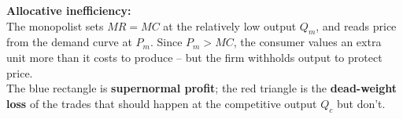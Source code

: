 \documentclass[11pt, a4paper, twoside]{book}
\begin{document}
\begin{diagrambox}
{%
}{%
\textbf{\color{CurveNavy}Allocative inefficiency:}\\[4pt]
The monopolist sets $MR=MC$ at the relatively low output $Q_m$, and reads price from the demand curve at $P_m$.  Since $P_m>MC$, the consumer values an extra unit more than it costs to produce -- but the firm withholds output to protect price.\\[5pt]
The blue rectangle is \textbf{supernormal profit}; the red triangle is the \textbf{dead-weight loss} of the trades that should happen at the competitive output $Q_c$ but don't.%
}
\end{diagrambox}
\end{document}
